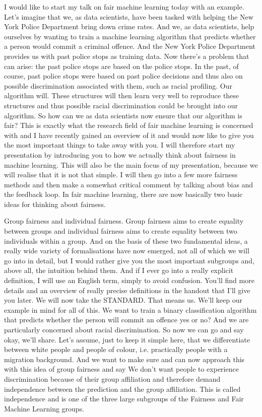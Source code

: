 
I would like to start my talk on fair machine learning today with an example. Let's imagine that we, as data scientists, have been tasked with helping the New York Police Department bring down crime rates. And we, as data scientists, help ourselves by wanting to train a machine learning algorithm that predicts whether a person would commit a criminal offence. And the New York Police Department provides us with past police stops as training data. Now there's a problem that can arise: the past police stops are based on the police stops. In the past, of course, past police stops were based on past police decisions and thus also on possible discrimination associated with them, such as racial profiling. Our algorithm will. These structures will then learn very well to reproduce these structures and thus possible racial discrimination could be brought into our algorithm. So how can we as data scientists now ensure that our algorithm is fair? This is exactly what the research field of fair machine learning is concerned with and I have recently gained an overview of it and would now like to give you the most important things to take away with you. I will therefore start my presentation by introducing you to how we actually think about fairness in machine learning. This will also be the main focus of my presentation, because we will realise that it is not that simple. I will then go into a few more fairness methods and then make a somewhat critical comment by talking about bias and the feedback loop. In fair machine learning, there are now basically two basic ideas for thinking about fairness.

Group fairness and individual fairness. Group fairness aims to create equality between groups and individual fairness aims to create equality between two individuals within a group. And on the basis of these two fundamental ideas, a really wide variety of formalisations have now emerged, not all of which we will go into in detail, but I would rather give you the most important subgroups and, above all, the intuition behind them. And if I ever go into a really explicit definition, I will use an English term, simply to avoid confusion. You'll find more details and an overview of really precise definitions in the handout that I'll give you later. We will now take the STANDARD. That means us. We'll keep our example in mind for all of this. We want to train a binary classification algorithm that predicts whether the person will commit an offence yes or no? And we are particularly concerned about racial discrimination. So now we can go and say okay, we'll share. Let's assume, just to keep it simple here, that we differentiate between white people and people of colour, i.e. practically people with a migration background. And we want to make sure and can now approach this with this idea of group fairness and say We don't want people to experience discrimination because of their group affiliation and therefore demand independence between the prediction and the group affiliation. This is called independence and is one of the three large subgroups of the Fairness and Fair Machine Learning groups.

